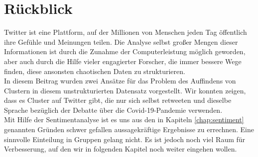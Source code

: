 \chapter{Rückblick}
\label{chap:ruckblick}
Twitter ist eine Plattform, auf der Millionen von Menschen jeden Tag öffentlich ihre Gefühle und Meinungen teilen. Die Analyse selbst großer Mengen dieser Informationen ist durch die Zunahme der Computerleistung möglich geworden, aber auch durch die Hilfe vieler engagierter Forscher, die immer bessere Wege finden, diese ansonsten chaotischen Daten zu strukturieren. \\ \newline
In diesem Beitrag wurden zwei Ansätze für das Problem des Auffindens von Clustern in diesem unstrukturierten Datensatz vorgestellt. Wir konnten zeigen, dass es Cluster auf Twitter gibt, die nur sich selbst retweeten und dieselbe Sprache bezüglich der Debatte über die Covid-19-Pandemie verwenden. \\ \newline
Mit Hilfe der Sentimentanalyse ist es uns aus den in Kapiteln \ref{chap:sentiment}  genannten Gründen schwer gefallen aussagekräftige Ergebnisse zu errechnen. Eine sinnvolle Einteilung in Gruppen gelang nicht. Es ist jedoch noch viel Raum für Verbesserung, auf den wir in folgenden Kapitel noch weiter eingehen wollen.

